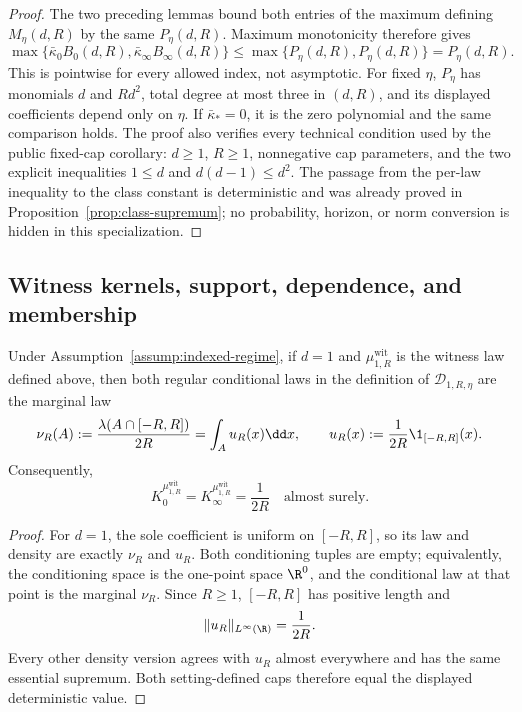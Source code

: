 \begin{proof}
The two preceding lemmas bound both entries of the maximum defining
$M_\eta(d,R)$ by the same $P_\eta(d,R)$.  Maximum monotonicity therefore
gives
\[
\max\{\bar\kappa_0B_0(d,R),\bar\kappa_\infty B_\infty(d,R)\}
\leq\max\{P_\eta(d,R),P_\eta(d,R)\}=P_\eta(d,R).
\]
This is pointwise for every allowed index, not asymptotic.  For fixed $\eta$,
$P_\eta$ has monomials $d$ and $Rd^2$, total degree at most three in
$(d,R)$, and its displayed coefficients depend only on $\eta$.  If
$\bar\kappa_*=0$, it is the zero polynomial and the same comparison holds.
The proof also verifies every technical condition used by the public
fixed-cap corollary: $d\geq1$, $R\geq1$, nonnegative cap parameters, and the
two explicit inequalities $1\leq d$ and $d(d-1)\leq d^2$.  The passage from
the per-law inequality to the class constant is deterministic and was
already proved in Proposition~\ref{prop:class-supremum}; no probability,
horizon, or norm conversion is hidden in this specialization.
\end{proof}

\subsection{Witness kernels, support, dependence, and membership}
\label{app:witness}

\begin{proposition}
\label{prop:degree-one-witness-kernels}
Under Assumption~\ref{assump:indexed-regime}, if $d=1$ and
$\mu^{\mathrm{wit}}_{1,R}$ is the witness law defined above, then both
regular conditional laws in the definition of
$\mathcal D_{1,R,\eta}$ are the marginal law
\[
\nu_R(A):=\frac{\lambda(A\cap[-R,R])}{2R}
=\int_Au_R(x)\dd x,
\qquad
u_R(x):=\frac1{2R}\1_{[-R,R]}(x).
\]
Consequently,
\[
K_0^{\mu^{\mathrm{wit}}_{1,R}}
=K_\infty^{\mu^{\mathrm{wit}}_{1,R}}
=\frac1{2R}
\quad\text{almost surely}.
\]
\end{proposition}

\begin{proof}
For $d=1$, the sole coefficient is uniform on $[-R,R]$, so its law and
density are exactly $\nu_R$ and $u_R$.  Both conditioning tuples are empty;
equivalently, the conditioning space is the one-point space $\R^0$, and the
conditional law at that point is the marginal $\nu_R$.  Since $R\geq1$,
$[-R,R]$ has positive length and
\[
\|u_R\|_{L^\infty(\R)}=\frac1{2R}.
\]
Every other density version agrees with $u_R$ almost everywhere and has the
same essential supremum.  Both setting-defined caps therefore equal the
displayed deterministic value.
\end{proof}

